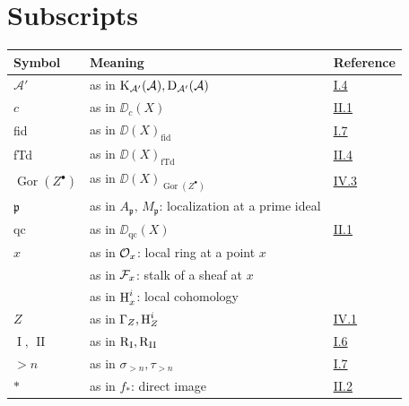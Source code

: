 \section*{Subscripts}
\begin{longtable}{@{}l p{8cm} l@{}}
	\toprule
	Symbol & Meaning & Reference \\
	\midrule
	$\mathcal A'$ & as in $\operatorname{K}_{\mathcal A'}(\mathcal{A}), \operatorname{D}_{\mathcal A'}(\mathcal{A})$ & \hyperref[sec:1.4]{I.4} \\
	$c$ & as in $\DD_c(X)$ & \hyperref[sec:2.1]{II.1} \\
	fid & as in $\DD(X)_{\text{fid}}$ & \hyperref[sec:1.7]{I.7} \\
	fTd & as in $\DD(X)_{\text{fTd}}$ & \hyperref[sec:2.4]{II.4} \\
	$\operatorname{Gor}(Z^\bullet)$ & as in $\DD(X)_{\operatorname{Gor}(Z^\bullet)}$ & \hyperref[sec:4.3]{IV.3} \\
	$\mathfrak{p}$ & as in $A_\mathfrak{p},\,M_\mathfrak{p}$: localization at a prime ideal & \\
	qc & as in $\DD_{\text{qc}}(X)$ & \hyperref[sec:2.1]{II.1} \\
	$x$ & as in $\mathcal{O}_x$: local ring at a point  $x$ & \\
	 & as in $\mathcal{F}_x$: stalk of a sheaf at  $x$ & \\
	 & as in $\operatorname{H}^i_x$: local cohomology & \\
	$Z$ & as in $\Gamma_Z,\operatorname{H}^i_Z$ & \hyperref[sec:4.1]{IV.1} \\
	$\operatorname{I},\,\operatorname{II}$ & as in $\operatorname{R}_{\operatorname{I}},\operatorname{R}_{\operatorname{II}}$ & \hyperref[sec:1.6]{I.6} \\
	$>n$ & as in $\sigma_{>n},\tau_{>n}$ & \hyperref[sec:1.7]{I.7} \\
	$*$ & as in $f_*$: direct image & \hyperref[sec:2.2]{II.2} \\
\end{longtable}

